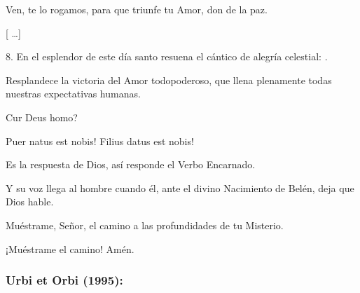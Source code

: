 \begin{body}
							Ven, te lo rogamos, para que triunfe tu Amor, don de la paz.
							
							{[} \ldots{}{]}
							
							8. En el esplendor de este día santo resuena el cántico de alegría celestial: .
							
							Resplandece la victoria del Amor todopoderoso, que llena plenamente todas nuestras expectativas humanas.
							
							Cur Deus homo?
							
							Puer natus est nobis! Filius datus est nobis!
							
							Es la respuesta de Dios, así responde el Verbo Encarnado.
							
							Y su voz llega al hombre cuando él, ante el divino Nacimiento de Belén, deja que Dios hable.
							
							Muéstrame, Señor, el camino a las profundidades de tu Misterio.
							
							¡Muéstrame el camino! Amén.
						\end{body}

					\subsubsection{Urbi et Orbi (1995):}

